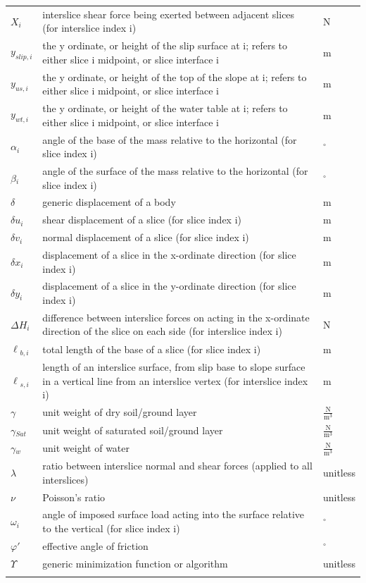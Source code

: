 \documentclass[12pt]{article}
\begin{document}
\begin{longtable*}{l l l}
\\
$X_{i}$ & interslice shear force being exerted between adjacent slices (for interslice index i) & N
\\
$y_{slip,i}$ & the y ordinate, or height of the slip surface at i; refers to either slice i midpoint, or slice interface i & m
\\
$y_{us,i}$ & the y ordinate, or height of the top of the slope at i; refers to either slice i midpoint, or slice interface i & m
\\
$y_{wt,i}$ & the y ordinate, or height of the water table at i; refers to either slice i midpoint, or slice interface i & m
\\
$\alpha{}_{i}$ & angle of the base of the mass relative to the horizontal (for slice index i) & ${}^{\circ}$
\\
$\beta{}_{i}$ & angle of the surface of the mass relative to the horizontal (for slice index i) & ${}^{\circ}$
\\
$\delta{}$ & generic displacement of a body & m
\\
$\delta{}u_{i}$ & shear displacement of a slice (for slice index i) & m
\\
$\delta{}v_{i}$ & normal displacement of a slice (for slice index i) & m
\\
$\delta{}x_{i}$ & displacement of a slice in the x-ordinate direction (for slice index i) & m
\\
$\delta{}y_{i}$ & displacement of a slice in the y-ordinate direction (for slice index i) & m
\\
$\Delta{}H_{i}$ & difference between interslice forces on acting in the x-ordinate direction of the slice on each side (for interslice index i) & N
\\
$\ell{}_{b,i}$ & total length of the base of a slice (for slice index i) & m
\\
$\ell{}_{s,i}$ & length of an interslice surface, from slip base to slope surface in a vertical line from an interslice vertex (for interslice index i) & m
\\
$\gamma{}$ & unit weight of dry soil/ground layer & $\frac{\text{N}}{\text{m}^{3}}$
\\
$\gamma{}_{Sat}$ & unit weight of saturated soil/ground layer & $\frac{\text{N}}{\text{m}^{3}}$
\\
$\gamma{}_{w}$ & unit weight of water & $\frac{\text{N}}{\text{m}^{3}}$
\\
$\lambda{}$ & ratio between interslice normal and shear forces (applied to all interslices) & unitless
\\
$\nu{}$ & Poisson's ratio & unitless
\\
$\omega{}_{i}$ & angle of imposed surface load acting into the surface relative to the vertical (for slice index i) & ${}^{\circ}$
\\
$\varphi{}'$ & effective angle of friction & ${}^{\circ}$
\\
$\Upsilon{}$ & generic minimization function or algorithm & unitless
\\
\bottomrule
\label{Table:ToS}
\end{longtable*}
\end{document}
